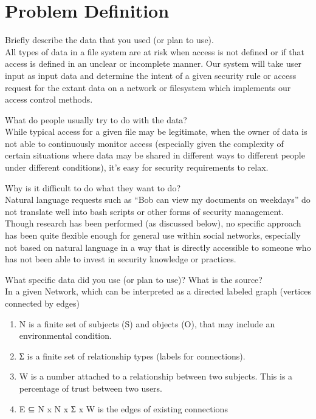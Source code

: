 \documentclass[12pt]{article}
\begin{document}
\section{Problem Definition}
Briefly describe the data that you used (or plan to use).\\ 
All types of data in a file system are at risk when access is not defined or if that access is defined in an unclear or incomplete manner. 
Our system will take user input as input data and determine the intent of a given security rule or access request for the extant data on a network or filesystem which implements our access control methods.

What do people usually try to do with the data? \\
While typical access for a given file may be legitimate, when the owner of data is not able to continuously monitor access (especially given the complexity of certain situations where data may be shared in different ways to different people under different conditions), it’s easy for security requirements to relax. 

Why is it difficult to do what they want to do? \\
Natural language requests such as “Bob can view my documents on weekdays” do not translate well into bash scripts or other forms of security management.
Though research has been performed (as discussed below), no specific approach has been quite flexible enough for general use within social networks, especially not based on natural language in a way that is directly accessible to someone who has not been able to invest in security knowledge or practices.

What specific data did you use (or plan to use)? What is the source? \\
In a given Network, which can be interpreted as a directed labeled graph (vertices connected by edges)
\begin{enumerate}
    \item N is a finite set of subjects (S) and objects (O), that may include an environmental condition.
    \item Ʃ is a finite set of relationship types (labels for connections).
    \item W is a number attached to a relationship between two subjects. This is a percentage of trust between two users.
    \item E ⊆ N x N x Ʃ x W is the edges of existing connections
\end{enumerate}
\end{document}
